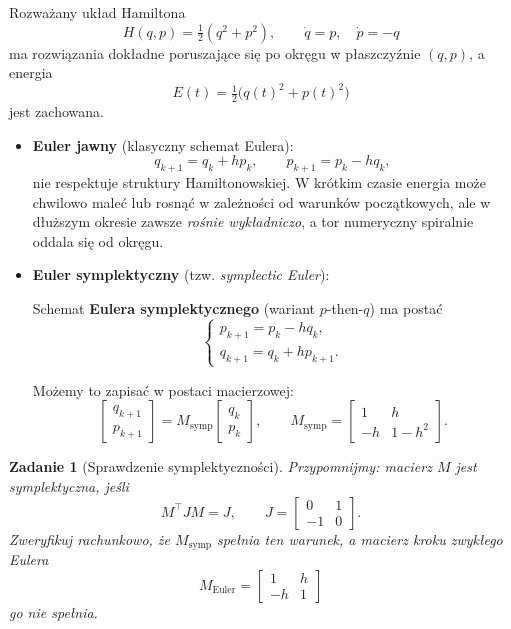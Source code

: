 \documentclass[12pt]{article}
\newtheorem{exer}{Zadanie}
\begin{document}
Rozważany układ Hamiltona
\[
H(q,p)=\tfrac{1}{2}(q^2+p^2), \qquad 
\dot q = p, \quad \dot p = -q
\]
ma rozwiązania dokładne poruszające się po okręgu w płaszczyźnie $(q,p)$, a energia
\[
E(t) = \tfrac{1}{2}\big(q(t)^2+p(t)^2\big)
\]
jest zachowana.

\begin{itemize}
\item \textbf{Euler jawny} (klasyczny schemat Eulera):
\[
q_{k+1} = q_k + h p_k, \qquad 
p_{k+1} = p_k - h q_k,
\]
nie respektuje struktury Hamiltonowskiej. W krótkim czasie energia może chwilowo maleć lub rosnąć w zależności od warunków początkowych, 
ale w dłuższym okresie zawsze \emph{rośnie wykładniczo}, a tor numeryczny spiralnie oddala się od okręgu.

\item \textbf{Euler symplektyczny} (tzw. \emph{symplectic Euler}):

Schemat \textbf{Eulera symplektycznego} (wariant $p$-then-$q$) ma postać
\[
\begin{cases}
p_{k+1} = p_k - h q_k, \\
q_{k+1} = q_k + h p_{k+1}.
\end{cases}
\]

Możemy to zapisać w postaci macierzowej:
\[
\begin{bmatrix} q_{k+1} \\ p_{k+1} \end{bmatrix}
=
M_{\text{symp}}
\begin{bmatrix} q_k \\ p_k \end{bmatrix},
\qquad 
M_{\text{symp}} = 
\begin{bmatrix}
1 & h \\ -h & 1-h^2
\end{bmatrix}.
\]
\end{itemize}

\begin{exer}[Sprawdzenie symplektyczności]
Przypomnijmy: macierz $M$ jest symplektyczna, jeśli
\[
M^\top J M = J, 
\qquad 
J=\begin{bmatrix}0 & 1 \\ -1 & 0\end{bmatrix}.
\]
Zweryfikuj rachunkowo, że $M_{\text{symp}}$ spełnia ten warunek, a macierz kroku zwykłego Eulera
\[
M_{\text{Euler}} = \begin{bmatrix}1 & h \\ -h & 1\end{bmatrix}
\]
go nie spełnia.
\end{exer}
\end{document}
